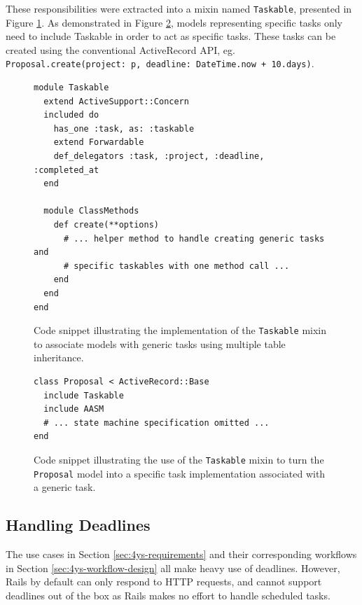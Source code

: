 \documentclass[document.tex]{subfiles}
\begin{document}
These responsibilities were extracted into a mixin named \verb!Taskable!, presented in Figure \ref{fig:taskable-mixin-definition}. As demonstrated in Figure \ref{fig:taskable-mixin-example}, models representing specific tasks only need to include Taskable in order to act as specific tasks. These tasks can be created using the conventional ActiveRecord API, eg. \\ \verb!Proposal.create(project: p, deadline: DateTime.now + 10.days)!.

\begin{figure}[!ht]
  \begin{lstlisting}
module Taskable
  extend ActiveSupport::Concern
  included do
    has_one :task, as: :taskable
    extend Forwardable
    def_delegators :task, :project, :deadline, :completed_at
  end

  module ClassMethods
    def create(**options)
      # ... helper method to handle creating generic tasks and
      # specific taskables with one method call ...
    end
  end
end
  \end{lstlisting}
  \cprotect\caption{Code snippet illustrating the implementation of the \verb!Taskable! mixin to associate models with generic tasks using multiple table inheritance.}
  \label{fig:taskable-mixin-definition}
\end{figure}

\begin{figure}[!ht]
  \begin{lstlisting}
class Proposal < ActiveRecord::Base
  include Taskable
  include AASM
  # ... state machine specification omitted ...
end
  \end{lstlisting}
  \cprotect\caption{Code snippet illustrating the use of the \verb!Taskable! mixin to turn the \verb!Proposal! model into a specific task implementation associated with a generic task.}
  \label{fig:taskable-mixin-example}
\end{figure}


\FloatBarrier


\subsection{Handling Deadlines}
\label {sec:4ys-handling-deadlines}

The use cases in Section \ref{sec:4ys-requirements} and their corresponding
workflows in Section \ref{sec:4ys-workflow-design} all make heavy use of deadlines. However, Rails by default can only respond to HTTP requests, and cannot support deadlines out of the box as Rails makes no effort to handle scheduled tasks.
\end{document}
